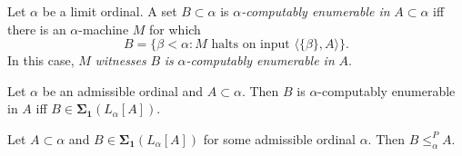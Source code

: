 \documentclass[12pt]{article}
\numberwithin{equation}{section}
\begin{document}
\begin{defi}
Let $\alpha$ be a limit ordinal. A set $B \subset \alpha$ is $\alpha$\emph{-computably enumerable in} $A \subset \alpha$ iff there is an $\alpha$-machine $M$ for which
\begin{equation*}
    B = \{\beta < \alpha : M \text{ halts on input } \langle \{\beta\}, A \rangle\} \text{.}
\end{equation*}
In this case, $M$ \emph{witnesses} $B$ \emph{is} $\alpha$\emph{-computably enumerable in} $A$.
\end{defi}

\begin{fact}\label{fact272}
Let $\alpha$ be an admissible ordinal and $A \subset \alpha$. Then $B$ is $\alpha$-computably enumerable in $A$ iff $B \in \mathbf{\Sigma_1}(L_{\alpha}[A])$.
\end{fact}

\begin{lem}\label{lem273}
Let $A \subset \alpha$ and $B \in \mathbf{\Sigma_1}(L_{\alpha}[A])$ for some admissible ordinal $\alpha$. Then $B \leq^P_{\alpha} A$.
\end{lem}
\end{document}
